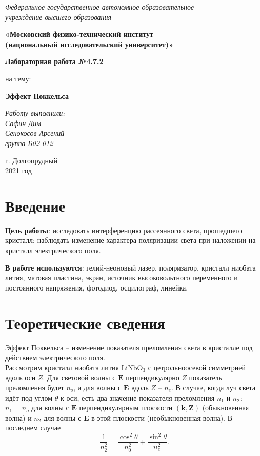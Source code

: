 \documentclass[a4paper,12pt]{article} %
\date{\today}
\begin{document}
 
\begin{titlepage}
\begin{center}
		\textit{\large {Федеральное государственное автономное образовательное\\ учреждение высшего образования} }
		\vspace{0.5ex}
			
		\textbf{\large {«Московский физико-технический институт\\ (национальный исследовательский университет)»}}
	\end{center}
	\vspace{10ex}
	\begin{center}
		\vspace{13ex}
		\textbf{\Large {Лабораторная работа №4.7.2}}
			
		\Large{на тему:}
		\vspace{1ex}
			
		\textbf{\Large {Эффект Поккельса}}
			
		\vspace{42ex}
		\begin{flushright}
			\noindent
			\textit{Работу выполнили:}
			\\
			\textit{Сафин Дим\\ Сенокосов Арсений\\ группа Б02-012}
		\end{flushright}
		\vfill
		г. Долгопрудный \\2021 год
	\end{center}
\end{titlepage}

\section*{Введение}
\textbf{Цель работы}: исследовать интерференцию рассеянного света, прошедшего кристалл; наблюдать изменение характера поляризации света при наложении на кристалл электрического поля.


\textbf{В работе используются}: гелий-неоновый лазер, поляризатор, кристалл ниобата лития, матовая пластина, экран, источник высоковольтного переменного и постоянного напряжения, фотодиод, осцилограф, линейка.
\section*{Теоретические сведения}
Эффект Поккельса -- изменение показателя преломления света в кристалле под действием электрического поля.\\
Рассмотрим кристалл ниобата лития $\text{LiNbO}_3$ с цетрольноосевой симметрией вдоль оси $Z$. Для световой волны с $\mathbf{E}$ перпендикулярно $Z$ показатель преломления будет $n_o$, а для волны с $\mathbf{E}$ вдоль $Z$ -- $n_e$. В случае, когда луч света идёт под углом $\theta$ к оси, есть два значение показателя преломления $n_1$ и $n_2$: $n_1 = n_o$ для волны с $\mathbf{E}$ перпендикулярным плоскости $(\mathbf{k},\mathbf{Z})$ (обыкновенная волна) и $n_2$ для волны с $\mathbf{E}$ в этой плоскости (необыкновенная волна). В последнем случае
\begin{equation}
\dfrac{1}{n_2^2}=\dfrac{\cos^2 \theta}{n_0^2}+\dfrac{\sin^2 \theta}{n_e^2}.
\end{equation}
\end{document}

